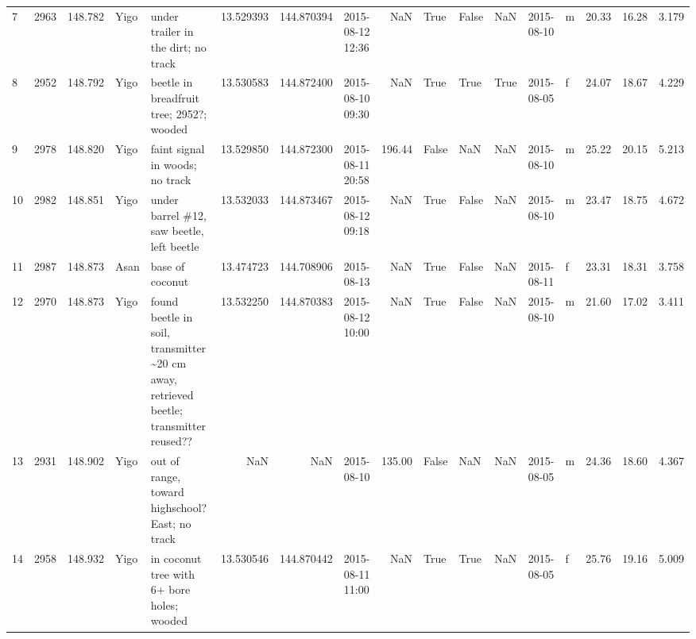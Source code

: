 \begin{tabular}{lrrllrrlrlllllrrr}
7  &       2963 &    148.782 &     Yigo &                                                    under trailer in the dirt; no track &  13.529393 &  144.870394 &     2015-08-12 12:36 &                     NaN &              True &   False &           NaN &       2015-08-10 &   m &   20.33 &  16.28 &   3.179 \\
8  &       2952 &    148.792 &     Yigo &                                               beetle in breadfruit tree; 2952?; wooded &  13.530583 &  144.872400 &     2015-08-10 09:30 &                     NaN &              True &    True &          True &       2015-08-05 &   f &   24.07 &  18.67 &   4.229 \\
9  &       2978 &    148.820 &     Yigo &                                                        faint signal in woods; no track &  13.529850 &  144.872300 &     2015-08-11 20:58 &                  196.44 &             False &     NaN &           NaN &       2015-08-10 &   m &   25.22 &  20.15 &   5.213 \\
10 &       2982 &    148.851 &     Yigo &                                              under barrel \#12, saw beetle, left beetle &  13.532033 &  144.873467 &     2015-08-12 09:18 &                     NaN &              True &   False &           NaN &       2015-08-10 &   m &   23.47 &  18.75 &   4.672 \\
11 &       2987 &    148.873 &     Asan &                                                                        base of coconut &  13.474723 &  144.708906 &           2015-08-13 &                     NaN &              True &   False &           NaN &       2015-08-11 &   f &   23.31 &  18.31 &   3.758 \\
12 &       2970 &    148.873 &     Yigo &  found beetle in soil, transmitter \textasciitilde20 cm away, retrieved beetle; transmitter reused?? &  13.532250 &  144.870383 &     2015-08-12 10:00 &                     NaN &              True &   False &           NaN &       2015-08-10 &   m &   21.60 &  17.02 &   3.411 \\
13 &       2931 &    148.902 &     Yigo &                                        out of range, toward highschool? East; no track &        NaN &         NaN &           2015-08-10 &                  135.00 &             False &     NaN &           NaN &       2015-08-05 &   m &   24.36 &  18.60 &   4.367 \\
14 &       2958 &    148.932 &     Yigo &                                             in coconut tree with 6+ bore holes; wooded &  13.530546 &  144.870442 &     2015-08-11 11:00 &                     NaN &              True &    True &           NaN &       2015-08-05 &   f &   25.76 &  19.16 &   5.009 \\

\end{tabular}

